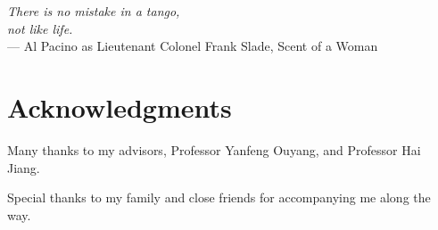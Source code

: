 
\begin{flushright}{\slshape
    There is no mistake in a tango, \\ \medskip
    not like life.} \\ \medskip
    --- Al Pacino as Lieutenant Colonel Frank Slade, Scent of a Woman
\end{flushright}



\bigskip

\begingroup
\let\clearpage\relax
\let\cleardoublepage\relax
\let\cleardoublepage\relax
\chapter*{Acknowledgments}

\noindent Many thanks to my advisors, Professor Yanfeng Ouyang, and Professor Hai Jiang.

\noindent Special thanks to my family and close friends for accompanying me along the way.





\endgroup



